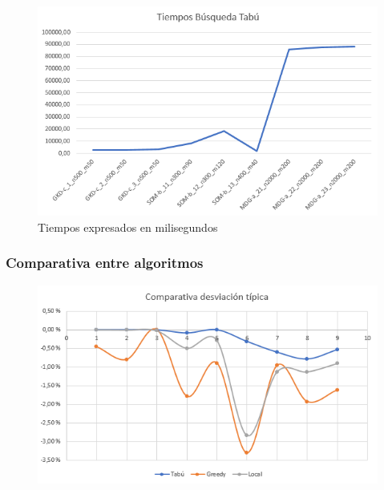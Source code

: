 \documentclass{article}
\begin{document}
			\begin{figure}[H]
				
				\centering
				\includegraphics[scale=0.4]{img/TiemposBtabu}
				\caption{Tiempos expresados en milisegundos}
				
			\end{figure}
	
		\subsubsection{Comparativa entre algoritmos}
			
			
			\begin{figure}[H]
				
				\centering
				\includegraphics[scale=0.4]{img/DTGlobal}
				
			\end{figure}
			
\end{document}
